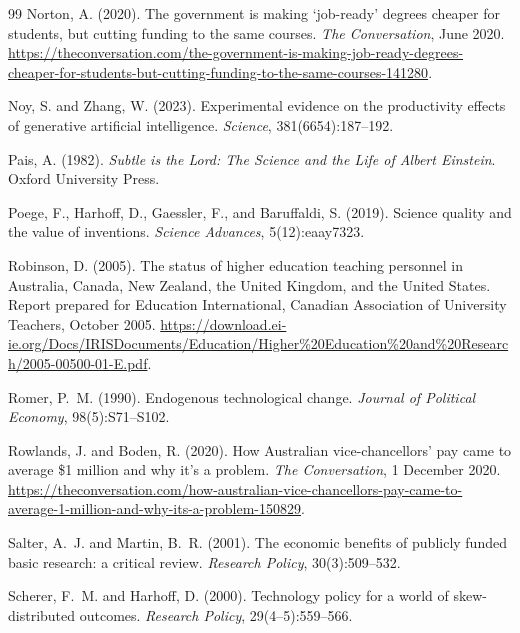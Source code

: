 \documentclass[11pt]{article}
\theoremstyle{definition}
\theoremstyle{remark}
\begin{document}
\begin{thebibliography}{99}
Norton, A. (2020).
\newblock The government is making `job-ready' degrees cheaper for students, but cutting funding to the same courses.
\newblock \emph{The Conversation}, June 2020. \url{https://theconversation.com/the-government-is-making-job-ready-degrees-cheaper-for-students-but-cutting-funding-to-the-same-courses-141280}.

Noy, S. and Zhang, W. (2023).
\newblock Experimental evidence on the productivity effects of generative artificial intelligence.
\newblock \emph{Science}, 381(6654):187--192.

Pais, A. (1982).
\newblock \emph{Subtle is the Lord: The Science and the Life of Albert Einstein}.
\newblock Oxford University Press.

Poege, F., Harhoff, D., Gaessler, F., and Baruffaldi, S. (2019).
\newblock Science quality and the value of inventions.
\newblock \emph{Science Advances}, 5(12):eaay7323.

Robinson, D. (2005).
\newblock The status of higher education teaching personnel in Australia, Canada, New Zealand, the United Kingdom, and the United States.
\newblock Report prepared for Education International, Canadian Association of University Teachers, October 2005. \url{https://download.ei-ie.org/Docs/IRISDocuments/Education/Higher%20Education%20and%20Research/2005-00500-01-E.pdf}.

Romer, P.~M. (1990).
\newblock Endogenous technological change.
\newblock \emph{Journal of Political Economy}, 98(5):S71--S102.

Rowlands, J. and Boden, R. (2020).
\newblock How Australian vice-chancellors' pay came to average \$1 million and why it's a problem.
\newblock \emph{The Conversation}, 1 December 2020. \url{https://theconversation.com/how-australian-vice-chancellors-pay-came-to-average-1-million-and-why-its-a-problem-150829}.

Salter, A.~J. and Martin, B.~R. (2001).
\newblock The economic benefits of publicly funded basic research: a critical review.
\newblock \emph{Research Policy}, 30(3):509--532.

Scherer, F.~M. and Harhoff, D. (2000).
\newblock Technology policy for a world of skew-distributed outcomes.
\newblock \emph{Research Policy}, 29(4--5):559--566.


\end{thebibliography}
\end{document}
